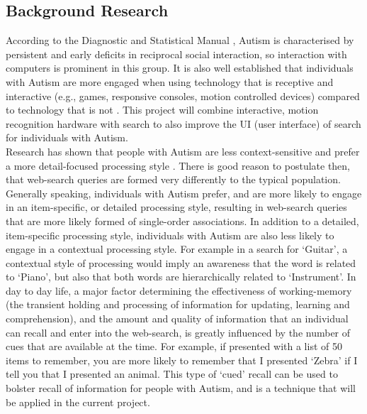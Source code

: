 \documentclass[a4paper, 11pt]{article}
\begin{document}
\subsection {Background Research}\label{background} 

According to the Diagnostic and Statistical Manual \cite{CDC}, Autism is characterised by persistent and early deficits in reciprocal social interaction, so interaction with computers is prominent in this group. It is also well established that individuals with Autism are more engaged when using technology that is receptive and interactive (e.g., games, responsive consoles, motion controlled devices) compared to technology that is not \cite{motioncontrollerforautism}. This project will combine interactive, motion recognition hardware with search to also improve the UI (user interface) of search for individuals with Autism.\\

\vspace{5mm}
Research has shown that people with Autism are less context-sensitive and prefer a more detail-focused processing style \cite{mottron}. There is good reason to postulate then, that web-search queries are formed very differently to the typical population. Generally speaking, individuals with Autism prefer, and are more likely to engage in an item-specific, or detailed processing style, resulting in web-search queries that are more likely formed of single-order associations. In addition to a detailed, item-specific processing style, individuals with Autism are also less likely to engage in a contextual processing style. For example in a search for `Guitar', a contextual style of processing would imply an awareness that the word is related to `Piano', but also that both words are hierarchically related to `Instrument'. In day to day life, a major factor determining the effectiveness of working-memory (the transient holding and processing of information for updating, learning and comprehension), and the amount and quality of information that an individual can recall and enter into the web-search, is greatly influenced by the number of cues that are available at the time. For example, if presented with a list of 50 items to remember, you are more likely to remember that I presented `Zebra' if I tell you that I presented an animal. This type of `cued' recall can be used to bolster recall of information for people with Autism, and is a technique that will be applied in the current project. \\
\end{document}
